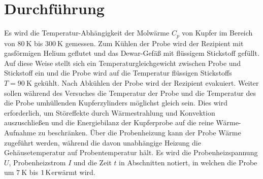 \section{Durchführung}
\label{sec:durchfuehrung}
Es wird die Temperatur-Abhängigkeit der Molwärme $C_p$ von Kupfer im
Bereich von $\SI{80}{\kelvin}$ bis $\SI{300}{\kelvin}$ gemessen.
Zum Kühlen der Probe wird der Rezipient mit gasförmigen Helium geflutet
und das Dewar-Gefäß mit flüssigem Stickstoff gefüllt.
Auf diese Weise stellt sich ein Temperaturgleichgewicht zwischen Probe und Stickstoff ein und die Probe wird auf die Temperatur flüssigen Stickstoffs $T=\SI{90}{\kelvin}$ \cite{stickstoff} gekühlt.
Nach Abkühlen der Probe wird der Rezipient evakuiert.
Weiter sollen während des Versuches die Temperatur der Probe und die Temperatur des die Probe umhüllenden Kupferzylinders möglichst gleich sein.
Dies wird erforderlich, um Störeffekte durch Wärmestrahlung und Konvektion auszuschließen und die Energiebilanz der Kupferprobe auf die reine Wärme-Aufnahme zu beschränken. 
Über die Probenheizung kann der Probe Wärme zugeführt werden, 
während die davon unabhängige Heizung die Gehäusetemperatur auf Probentemperatur hält.
Es wird die Probenheizspannung $U$, Probenheizstrom $I$ und die Zeit $t$ in Abschnitten notiert, 
in welchen die Probe um $\SI{7}{\kelvin}$ bis $\SI1{\kelvin}$erwärmt wird.